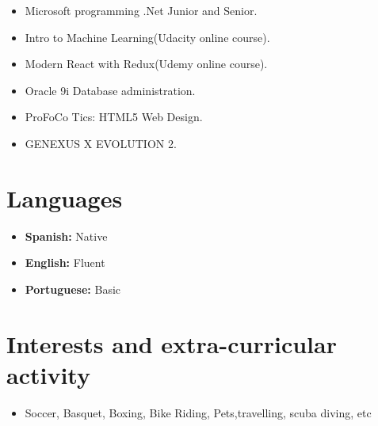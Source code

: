 \documentclass[11pt,a4paper,sans]{moderncv}        %
\begin{document}
\vspace{6pt}

\begin{itemize}

\item Microsoft programming .Net Junior and Senior.

\vspace{6pt}

\item Intro to Machine Learning(Udacity online course).

\vspace{6pt}

\item Modern React with Redux(Udemy online course).

\vspace{6pt}

\item Oracle 9i Database administration.

\vspace{6pt}

\item ProFoCo Tics: HTML5 Web Design.

\vspace{6pt}

\item GENEXUS X EVOLUTION 2.

\vspace{6pt}

\end{itemize}

\section{Languages}

\vspace{6pt}

\begin{itemize}

\item \textbf{Spanish:} Native

\vspace{6pt}

\item \textbf{English:} Fluent

\vspace{6pt}

\item \textbf{Portuguese:} Basic

\vspace{6pt}

\end{itemize}

\section{Interests and extra-curricular activity}

\vspace{6pt}

\begin{itemize}

\item{Soccer, Basquet, Boxing, Bike Riding, Pets,travelling, scuba diving, etc}

\vspace{6pt}

\end{itemize}
\end{document}
